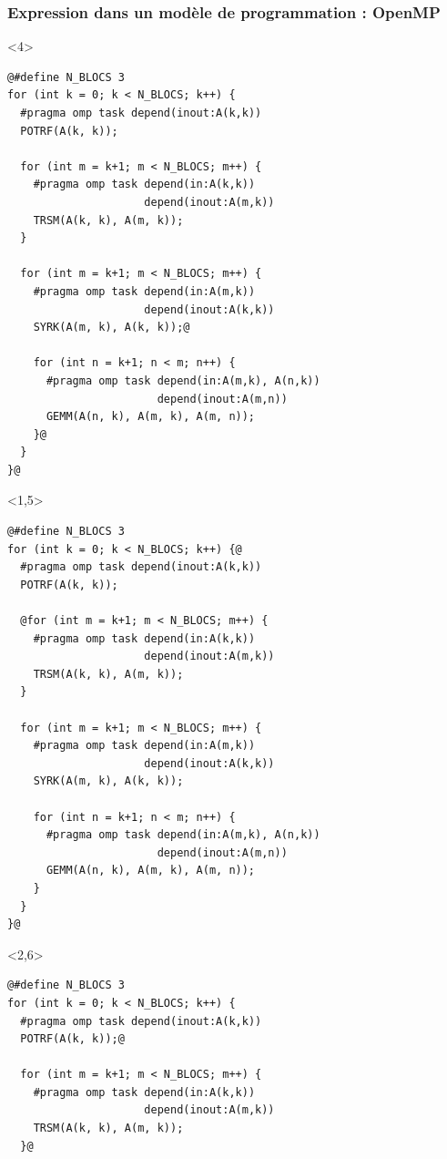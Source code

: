 \documentclass[xcolor={usenames,dvipsnames,svgnames,table}, aspectratio=43]{beamer}
\begin{document}
\begin{frame}[fragile]
\frametitle{Expression dans un modèle de programmation : OpenMP}

\begin{minipage}[t]{0.52\linewidth}
  \vspace{0.3cm}
  \begin{onlyenv}<4>
  \begin{lstlisting}[style=transparency]
@#define N_BLOCS 3
for (int k = 0; k < N_BLOCS; k++) {
  #pragma omp task depend(inout:A(k,k))
  POTRF(A(k, k));

  for (int m = k+1; m < N_BLOCS; m++) {
    #pragma omp task depend(in:A(k,k))
                     depend(inout:A(m,k))
    TRSM(A(k, k), A(m, k));
  }

  for (int m = k+1; m < N_BLOCS; m++) {
    #pragma omp task depend(in:A(m,k))
                     depend(inout:A(k,k))
    SYRK(A(m, k), A(k, k));@

    for (int n = k+1; n < m; n++) {
      #pragma omp task depend(in:A(m,k), A(n,k))
                       depend(inout:A(m,n))
      GEMM(A(n, k), A(m, k), A(m, n));
    }@
  }
}@
  \end{lstlisting}
\end{onlyenv}
  \begin{onlyenv}<1,5>
  \begin{lstlisting}[style=transparency]
@#define N_BLOCS 3
for (int k = 0; k < N_BLOCS; k++) {@
  #pragma omp task depend(inout:A(k,k))
  POTRF(A(k, k));

  @for (int m = k+1; m < N_BLOCS; m++) {
    #pragma omp task depend(in:A(k,k))
                     depend(inout:A(m,k))
    TRSM(A(k, k), A(m, k));
  }

  for (int m = k+1; m < N_BLOCS; m++) {
    #pragma omp task depend(in:A(m,k))
                     depend(inout:A(k,k))
    SYRK(A(m, k), A(k, k));

    for (int n = k+1; n < m; n++) {
      #pragma omp task depend(in:A(m,k), A(n,k))
                       depend(inout:A(m,n))
      GEMM(A(n, k), A(m, k), A(m, n));
    }
  }
}@
  \end{lstlisting}
\end{onlyenv}
  \begin{onlyenv}<2,6>
  \begin{lstlisting}[style=transparency]
@#define N_BLOCS 3
for (int k = 0; k < N_BLOCS; k++) {
  #pragma omp task depend(inout:A(k,k))
  POTRF(A(k, k));@

  for (int m = k+1; m < N_BLOCS; m++) {
    #pragma omp task depend(in:A(k,k))
                     depend(inout:A(m,k))
    TRSM(A(k, k), A(m, k));
  }@


\end{lstlisting}
\end{onlyenv}
\end{minipage}
\end{frame}
\end{document}
